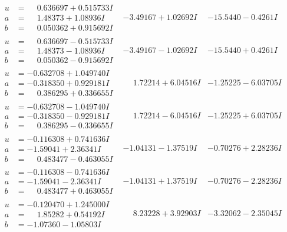 \documentclass[1p]{elsarticle_modified}
\theoremstyle{definition}
\begin{document}
$$\begin{array}{c|c|c}
\begin{aligned}
u &= \phantom{-}0.636697 + 0.515733 I \\
a &= \phantom{-}1.48373 + 1.08936 I \\
b &= \phantom{-}0.050362 + 0.915692 I\end{aligned}
 & -3.49167 + 1.02692 I & -15.5440 - 0.4261 I \\ \hline\begin{aligned}
u &= \phantom{-}0.636697 - 0.515733 I \\
a &= \phantom{-}1.48373 - 1.08936 I \\
b &= \phantom{-}0.050362 - 0.915692 I\end{aligned}
 & -3.49167 - 1.02692 I & -15.5440 + 0.4261 I \\ \hline\begin{aligned}
u &= -0.632708 + 1.049740 I \\
a &= -0.318350 + 0.929181 I \\
b &= \phantom{-}0.386295 + 0.336655 I\end{aligned}
 & \phantom{-}1.72214 + 6.04516 I & -1.25225 - 6.03705 I \\ \hline\begin{aligned}
u &= -0.632708 - 1.049740 I \\
a &= -0.318350 - 0.929181 I \\
b &= \phantom{-}0.386295 - 0.336655 I\end{aligned}
 & \phantom{-}1.72214 - 6.04516 I & -1.25225 + 6.03705 I \\ \hline\begin{aligned}
u &= -0.116308 + 0.741636 I \\
a &= -1.59041 + 2.36341 I \\
b &= \phantom{-}0.483477 - 0.463055 I\end{aligned}
 & -1.04131 - 1.37519 I & -0.70276 + 2.28236 I \\ \hline\begin{aligned}
u &= -0.116308 - 0.741636 I \\
a &= -1.59041 - 2.36341 I \\
b &= \phantom{-}0.483477 + 0.463055 I\end{aligned}
 & -1.04131 + 1.37519 I & -0.70276 - 2.28236 I \\ \hline\begin{aligned}
u &= -0.120470 + 1.245000 I \\
a &= \phantom{-}1.85282 + 0.54192 I \\
b &= -1.07360 - 1.05803 I\end{aligned}
 & \phantom{-}8.23228 + 3.92903 I & -3.32062 - 2.35045 I \\ \hline\begin{aligned}

\end{aligned}
\end{array}$$
\end{document}
